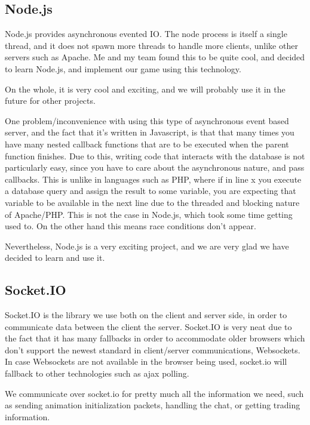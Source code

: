 \documentclass[a4paper,11pt]{article}
\begin{document}
		\subsection{Node.js}
		
			Node.js provides asynchronous evented IO. The node process is itself a single thread, and it does not spawn more threads to handle more clients, unlike other servers such as Apache. Me and my team found this to be quite cool, and decided to learn Node.js, and implement our game using this technology.
			
			On the whole, it is very cool and exciting, and we will probably use it in the future for other projects.
			
			One problem/inconvenience with using this type of asynchronous event based server, and the fact that it's written in Javascript, is that that many times you have many nested callback functions that are to be executed when the parent function finishes. Due to this, writing code that interacts with the database is not particularly easy, since you have to care about the asynchronous nature, and pass callbacks. This is unlike in languages such as PHP, where if in line x you execute a database query and assign the result to some variable, you are expecting that variable to be available in the next line due to the threaded and blocking nature of Apache/PHP. This is not the case in Node.js, which took some time getting used to. On the other hand this means race conditions don't appear.
			
			Nevertheless, Node.js is a very exciting project, and we are very glad we have decided to learn and use it.		
		
		\subsection{Socket.IO}
		
			Socket.IO is the library we use both on the client and server side, in order to communicate data between the client the server. Socket.IO is very neat due to the fact that it has many fallbacks in order to accommodate older browsers which don't support the newest standard in client/server communications, Websockets. In case Websockets are not available in the browser being used, socket.io will fallback to other technologies such as ajax polling.
		
			We communicate over socket.io for pretty much all the information we need, such as sending animation initialization packets, handling the chat, or getting trading information.
		
\end{document}
